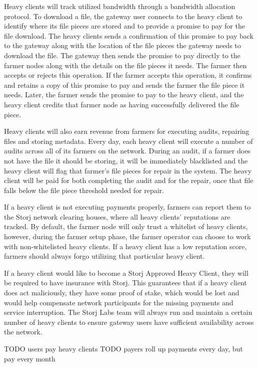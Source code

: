 \documentclass[a4paper,10pt]{article} \usepackage[utf8]{inputenc}
\newcommand{\todo}[1]{{\color{red} TODO #1 }}
\begin{document}
Heavy clients will track utilized bandwidth through a bandwidth allocation
protocol. To download a file, the gateway user connects to the heavy client to
identify where its file pieces are stored and to provide a promise to pay for
the file download. The heavy clients sends a confirmation of this promise to
pay back to the gateway along with the location of the file pieces the gateway
needs to download the file. The gateway then sends the promise to pay directly
to the farmer nodes along with the details on the file pieces it needs. The
farmer then accepts or rejects this operation. If the farmer accepts this
operation, it confirms and retains a copy of this promise to pay and sends the
farmer the file piece it needs. Later, the farmer sends the promise to pay to
the heavy client, and the heavy client credits that farmer node as having
successfully delivered the file piece.

Heavy clients will also earn revenue from farmers for executing audits,
repairing files and storing metadata. Every day, each heavy client will execute
a number of audits across all of its farmers on the network. During an audit,
if a farmer does not have the file it should be storing, it will be immediately
blacklisted and the heavy client will flag that farmer’s file pieces for repair
in the system. The heavy client will be paid for both completing the audit and
for the repair, once that file falls below the file piece threshold needed for
repair.

If a heavy client is not executing payments properly, farmers can report them
to the Storj network clearing houses, where all heavy clients’ reputations are
tracked. By default, the farmer node will only trust a whitelist of heavy
clients, however, during the farmer setup phase, the farmer operator can choose
to work with non-whitelisted heavy clients. If a heavy client has a low
reputation score, farmers should always forgo utilizing that particular heavy
client.

If a heavy client would like to become a Storj Approved Heavy Client,
they will be required to have insurance with Storj. This guarantees that if a
heavy client does act maliciously, they have some proof of stake, which would
be lost and would help compensate network participants for the missing payments
and service interruption. The Storj Labs team will always run and maintain a
certain number of heavy clients to ensure gateway users have sufficient
availability across the network.

\todo{users pay heavy clients}
\todo{payers roll up payments every day, but pay every month}
\end{document}
